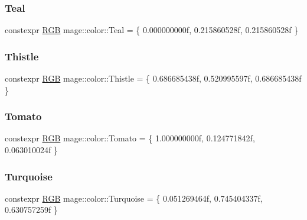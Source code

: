 \hypertarget{namespacemage_1_1color_a80f897dd60d4faed02aeb55da726e013}{}\label{namespacemage_1_1color_a80f897dd60d4faed02aeb55da726e013} 
\subsubsection{\texorpdfstring{Teal}{Teal}}
{\footnotesize\ttfamily constexpr \hyperlink{structmage_1_1_r_g_b}{R\+GB} mage\+::color\+::\+Teal = \{ 0.\+000000000f, 0.\+215860528f, 0.\+215860528f \}}

\hypertarget{namespacemage_1_1color_a83d1f3bdc2f2cd9008bd7b3595a7ebe2}{}\label{namespacemage_1_1color_a83d1f3bdc2f2cd9008bd7b3595a7ebe2} 
\subsubsection{\texorpdfstring{Thistle}{Thistle}}
{\footnotesize\ttfamily constexpr \hyperlink{structmage_1_1_r_g_b}{R\+GB} mage\+::color\+::\+Thistle = \{ 0.\+686685438f, 0.\+520995597f, 0.\+686685438f \}}

\hypertarget{namespacemage_1_1color_a9b06c8cba67af690ad468fc816c33932}{}\label{namespacemage_1_1color_a9b06c8cba67af690ad468fc816c33932} 
\subsubsection{\texorpdfstring{Tomato}{Tomato}}
{\footnotesize\ttfamily constexpr \hyperlink{structmage_1_1_r_g_b}{R\+GB} mage\+::color\+::\+Tomato = \{ 1.\+000000000f, 0.\+124771842f, 0.\+063010024f \}}

\hypertarget{namespacemage_1_1color_aec5f952221972849e7c9033eb2dc8dcf}{}\label{namespacemage_1_1color_aec5f952221972849e7c9033eb2dc8dcf} 
\subsubsection{\texorpdfstring{Turquoise}{Turquoise}}
{\footnotesize\ttfamily constexpr \hyperlink{structmage_1_1_r_g_b}{R\+GB} mage\+::color\+::\+Turquoise = \{ 0.\+051269464f, 0.\+745404337f, 0.\+630757259f \}}

